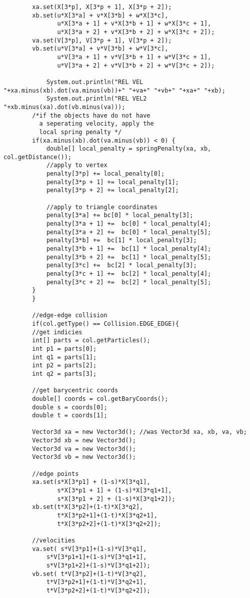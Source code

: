 \begin{lstlisting}
		xa.set(X[3*p], X[3*p + 1], X[3*p + 2]);
		xb.set(u*X[3*a] + v*X[3*b] + w*X[3*c],
		       u*X[3*a + 1] + v*X[3*b + 1] + w*X[3*c + 1],
		       u*X[3*a + 2] + v*X[3*b + 2] + w*X[3*c + 2]);
		va.set(V[3*p], V[3*p + 1], V[3*p + 2]);
		vb.set(u*V[3*a] + v*V[3*b] + w*V[3*c],
		       u*V[3*a + 1] + v*V[3*b + 1] + w*V[3*c + 1],
		       u*V[3*a + 2] + v*V[3*b + 2] + w*V[3*c + 2]);

			System.out.println("REL VEL "+xa.minus(xb).dot(va.minus(vb))+" "+va+" "+vb+" "+xa+" "+xb);
			System.out.println("REL VEL2 "+xb.minus(xa).dot(vb.minus(va)));
		/*if the objects have do not have
		  a seperating velocity, apply the 
		  local spring penalty */
		if(xa.minus(xb).dot(va.minus(vb)) < 0) {
		    double[] local_penalty = springPenalty(xa, xb, col.getDistance());
		    //apply to vertex
		    penalty[3*p] += local_penalty[0];
		    penalty[3*p + 1] += local_penalty[1];
		    penalty[3*p + 2] += local_penalty[2];

		    //apply to triangle coordinates
		    penalty[3*a] += bc[0] * local_penalty[3];
		    penalty[3*a + 1] +=  bc[0] * local_penalty[4];
		    penalty[3*a + 2] +=  bc[0] * local_penalty[5];
		    penalty[3*b] +=  bc[1] * local_penalty[3];
		    penalty[3*b + 1] +=  bc[1] * local_penalty[4];
		    penalty[3*b + 2] +=  bc[1] * local_penalty[5];
		    penalty[3*c] +=  bc[2] * local_penalty[3];
		    penalty[3*c + 1] +=  bc[2] * local_penalty[4];
		    penalty[3*c + 2] +=  bc[2] * local_penalty[5];
		}
	    }
		
	    //edge-edge collision
	    if(col.getType() == Collision.EDGE_EDGE){
		//get indicies
		int[] parts = col.getParticles();
		int p1 = parts[0];
		int q1 = parts[1];
		int p2 = parts[2];
		int q2 = parts[3];

		//get barycentric coords
		double[] coords = col.getBaryCoords();
		double s = coords[0];
		double t = coords[1];

		Vector3d xa = new Vector3d(); //was Vector3d xa, xb, va, vb;
		Vector3d xb = new Vector3d();
		Vector3d va = new Vector3d();
		Vector3d vb = new Vector3d();

		//edge points
		xa.set(s*X[3*p1] + (1-s)*X[3*q1],
		       s*X[3*p1 + 1] + (1-s)*X[3*q1+1],
		       s*X[3*p1 + 2] + (1-s)*X[3*q1+2]);
		xb.set(t*X[3*p2]+(1-t)*X[3*q2],
		       t*X[3*p2+1]+(1-t)*X[3*q2+1],
		       t*X[3*p2+2]+(1-t)*X[3*q2+2]);

		//velocities
		va.set(	s*V[3*p1]+(1-s)*V[3*q1],
			s*V[3*p1+1]+(1-s)*V[3*q1+1],
			s*V[3*p1+2]+(1-s)*V[3*q1+2]);
		vb.set(	t*V[3*p2]+(1-t)*V[3*q2],
			t*V[3*p2+1]+(1-t)*V[3*q2+1],
			t*V[3*p2+2]+(1-t)*V[3*q2+2]);


\end{lstlisting}

